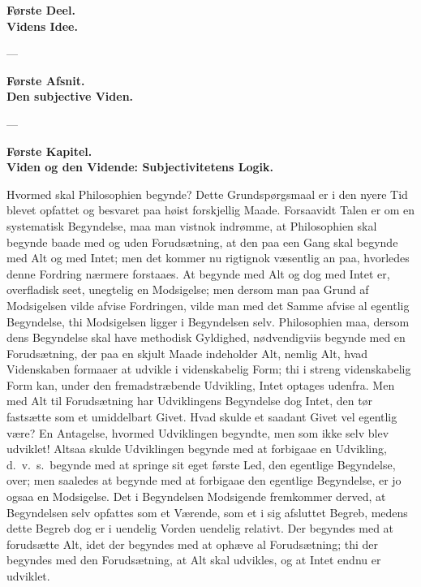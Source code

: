 \documentclass[12pt]{book}
\newcommand{\opage}[1]{\marginnote{\footnotesize\textit{[#1]}}}
\begin{document}
\opage{1} \begin{center}
{\large\bfseries Første Deel.}\\[3pt]
{\Huge\bfseries Videns Idee.}
\end{center}
\begin{center}---\end{center}
\begin{center}
{\large\bfseries Første Afsnit.}\\[3pt]
{\LARGE\bfseries Den subjective Viden.}
\end{center}
\begin{center}---\end{center}
\begin{center}
{\large\bfseries Første Kapitel.}\\[3pt]
{\Large\bfseries Viden og den Vidende: Subjectivitetens Logik.}
\end{center}

\noindent Hvormed skal Philosophien begynde? Dette Grundspørgsmaal er i den nyere
Tid blevet opfattet og besvaret paa høist forskjellig Maade. Forsaavidt Talen er om
en systematisk Begyndelse, maa man vistnok indrømme, at Philosophien skal begynde
baade med og uden Forudsætning, at den paa een Gang skal begynde med Alt og med
Intet; men det kommer nu rigtignok væsentlig an paa, hvorledes denne Fordring
nærmere forstaaes. At begynde med Alt og dog med Intet er, overfladisk seet,
unegtelig en Modsigelse; men dersom man paa Grund af Modsigelsen vilde afvise
Fordringen, vilde man med det Samme afvise al egentlig Begyndelse, thi Modsigelsen
ligger i Begyndelsen selv. Philosophien maa, dersom dens Begyndelse skal have
methodisk Gyldighed, nødvendigviis begynde med en Forudsætning, der paa en skjult
Maade indeholder Alt, nemlig Alt, hvad Videnskaben formaaer at udvikle i
videnskabelig Form; thi i streng
\opage{2} videnskabelig Form kan, under den fremadstræbende Udvikling, Intet optages udenfra.
Men med Alt til Forudsætning har Udviklingens Begyndelse dog Intet, den tør
fastsætte som et umiddelbart Givet. Hvad skulde et saadant Givet vel egentlig være?
En Antagelse, hvormed Udviklingen begyndte, men som ikke selv blev udviklet! Altsaa
skulde Udviklingen begynde med at forbigaae en Udvikling, d.\ v.\ s.\ begynde med at
springe sit eget første Led, den egentlige Begyndelse, over; men saaledes at begynde
med at forbigaae den egentlige Begyndelse, er jo ogsaa en Modsigelse. Det i
Begyndelsen Modsigende fremkommer derved, at Begyndelsen selv opfattes som et
Værende, som et i sig afsluttet Begreb, medens dette Begreb dog er i uendelig Vorden
uendelig relativt. Der begyndes med at forudsætte Alt, idet der begyndes med at
ophæve al Forudsætning; thi der begyndes med den Forudsætning, at Alt skal udvikles,
og at Intet endnu er udviklet.
\end{document}
